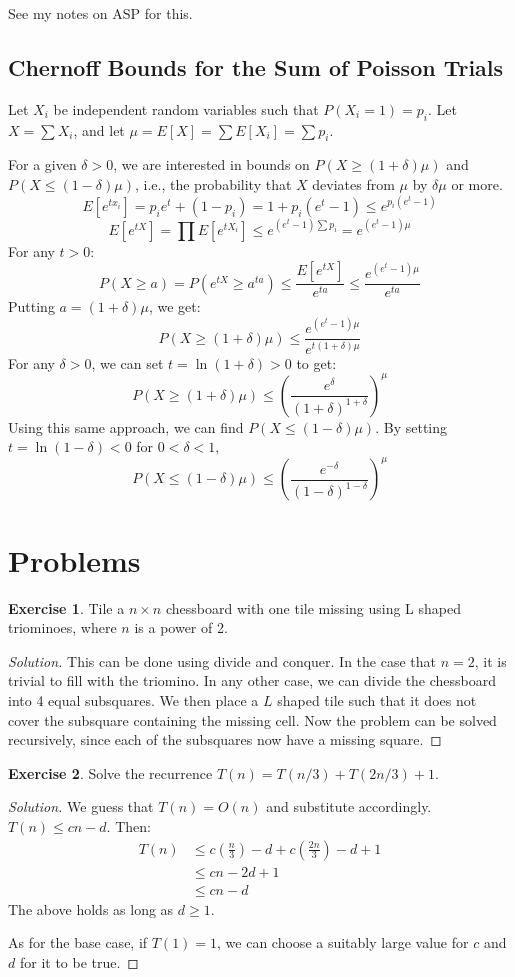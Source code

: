 \documentclass[12pt,letterpaper]{article}
\theoremstyle{definition}
\newtheorem*{exercise}{Exercise}
\newenvironment{solution}
  {\renewcommand\qedsymbol{$\blacksquare$}\begin{proof}[Solution]}
  {\end{proof}}
\begin{document}
See my notes on ASP for this.

\subsection{Chernoff Bounds for the Sum of Poisson Trials}

Let $X_i$ be independent random variables such that $P(X_i=1) = p_i$. Let $X = \sum X_i$, and let $\mu = E[X] = \sum E[X_i] = \sum p_i$.

For a given $\delta > 0$, we are interested in bounds on $P(X \geq (1+\delta)\mu)$ and $P(X \leq (1 - \delta) \mu)$, i.e., the probability that $X$ deviates from $\mu$ by $\delta \mu$ or more.
\[E[e^{tx_i}] = p_i e^t + (1-p_i) = 1+p_i(e^t - 1) \leq e^{p_i(e^t-1)}\]
\[E[e^{tX}] = \prod E[e^{tX_i}] \leq e^{(e^t-1) \sum p_i} = e^{(e^t-1)\mu}\]
For any $t > 0$:
\[P(X \geq a) = P(e^{tX} \geq a^{ta}) \leq \frac{E[e^{tX}]}{e^{ta}} \leq \frac{e^{(e^t-1) \mu}}{e^{ta}}\]
Putting $a = (1+\delta) \mu$, we get:
\[P(X \geq (1+\delta) \mu) \leq \frac{e^{(e^t-1)\mu}}{e^{t(1+\delta)\mu}}\]
For any $\delta > 0$, we can set $t = \ln (1+\delta) > 0$ to get:
\[P(X \geq (1+\delta) \mu) \leq \left ( \frac{e^{\delta}}{(1+\delta)^{1+\delta}} \right)^\mu\]
Using this same approach, we can find $P(X \leq (1-\delta) \mu)$. By setting $t = \ln (1-\delta) < 0$ for $0 < \delta < 1$,
\[P(X \leq (1- \delta) \mu) \leq \left( \frac{e^{-\delta}}{(1-\delta)^{1-\delta}}\right)^\mu\]

\section{Problems}

\begin{exercise}
  Tile a $n \times n$ chessboard with one tile missing using L shaped triominoes, where $n$ is a power of 2.
\end{exercise}
\begin{solution}
  This can be done using divide and conquer. In the case that $n = 2$, it is trivial to fill with the triomino.
  In any other case, we can divide the chessboard into 4 equal subsquares. We then place a $L$ shaped tile such that it does not cover the subsquare containing the missing cell. Now the problem can be solved recursively, since each of the subsquares now have a missing square.
\end{solution}

\begin{exercise}
  Solve the recurrence $T(n) = T(n/3) + T(2n/3) + 1$.
\end{exercise}
\begin{solution}
  We guess that $T(n) = O(n)$ and substitute accordingly. $T(n) \leq cn-d$. Then:
  \begin{align*}
    T(n) & \leq c(\frac{n}{3}) - d + c(\frac{2n}{3})  - d + 1 \\
         &\leq cn -2d + 1 \\
         &\leq cn-d
  \end{align*}
  The above holds as long as $d \geq 1$.

  As for the base case, if $T(1) = 1$, we can choose a suitably large value for $c$ and $d$ for it to be true.
\end{solution}
\end{document}
